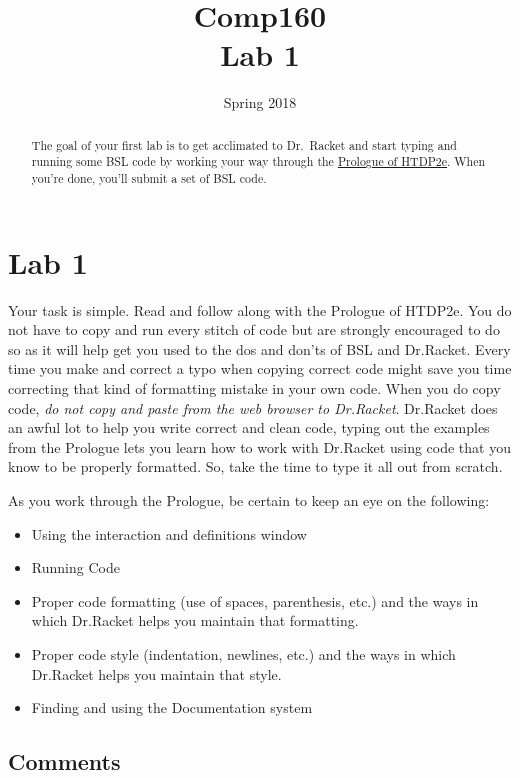 \documentclass[nobib]{tufte-handout}
\title{Comp160 \\ Lab 1 }
\author{}
\date{ Spring 2018 }
\begin{document}
\maketitle

\begin{abstract}
The goal of your first lab is to get acclimated to Dr.\ Racket and start typing and running some BSL code by working your way through the \href{http://www.ccs.neu.edu/home/matthias/HtDP2e/part_prologue.html}{Prologue of HTDP2e}. When you're done, you'll submit a set of BSL code.
\end{abstract}


\section{Lab 1}

Your task is simple. Read and follow along with the Prologue of HTDP2e.  You do not have to copy and run every stitch of code but are strongly encouraged to do so as it will help get you used to the dos and don'ts of BSL and Dr.Racket.  Every time you make and correct a typo when copying correct code might save you time correcting that kind of formatting mistake in your own code. When you do copy code, \textit{do not copy and paste from the web browser to Dr.Racket}.  Dr.Racket does an awful lot to help you write correct and clean code, typing out the examples from the Prologue lets you learn how to work with Dr.Racket using code that you know to be properly formatted. So, take the time to type it all out from scratch.

As you work through the Prologue, be certain to keep an eye on the following:
\begin{itemize}
  \item Using the interaction and definitions window
  \item Running Code
  \item Proper code formatting (use of spaces, parenthesis, etc.) and the ways in which Dr.Racket helps you maintain that formatting.
  \item Proper code style (indentation, newlines, etc.) and the ways in which Dr.Racket helps you maintain that style.
  \item Finding and using the Documentation system
\end{itemize}

\subsection{Comments}
\end{document}
